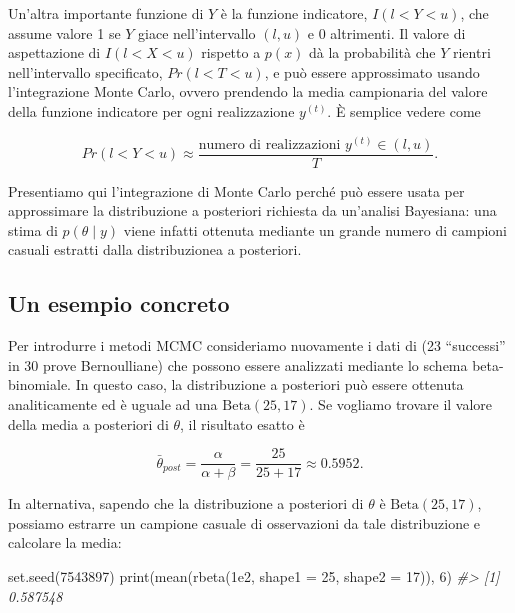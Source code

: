 \documentclass[
  11pt,
]{krantz}
\makeatletter
\newenvironment{Shaded}{\begin{snugshade}}{\end{snugshade}}
\newcommand{\AttributeTok}[1]{\textcolor[rgb]{0.61,0.61,0.61}{#1}}
\newcommand{\CommentTok}[1]{\textcolor[rgb]{0.37,0.37,0.37}{\textit{#1}}}
\newcommand{\DecValTok}[1]{\textcolor[rgb]{0.06,0.06,0.06}{#1}}
\newcommand{\FloatTok}[1]{\textcolor[rgb]{0.06,0.06,0.06}{#1}}
\newcommand{\FunctionTok}[1]{\textcolor[rgb]{0,0,0}{#1}}
\newcommand{\NormalTok}[1]{#1}
\newenvironment{kframe}{%
\medskip{}
\setlength{\fboxsep}{.8em}
 \def\at@end@of@kframe{}%
 \ifinner\ifhmode%
  \def\at@end@of@kframe{\end{minipage}}%
  \begin{minipage}{\columnwidth}%
 \fi\fi%
 \def\FrameCommand##1{\hskip\@totalleftmargin \hskip-\fboxsep
 \colorbox{shadecolor}{##1}\hskip-\fboxsep
     \hskip-\linewidth \hskip-\@totalleftmargin \hskip\columnwidth}%
 \MakeFramed {\advance\hsize-\width
   \@totalleftmargin\z@ \linewidth\hsize
   \@setminipage}}%
 {\par\unskip\endMakeFramed%
 \at@end@of@kframe}
\renewenvironment{Shaded}{\begin{kframe}}{\end{kframe}}
\theoremstyle{definition}
\theoremstyle{definition}
\theoremstyle{definition}
\theoremstyle{definition}
\theoremstyle{remark}
\makeatother
\begin{document}
Un'altra importante funzione di \(Y\) è la funzione indicatore, \(I(l < Y < u)\), che assume valore 1 se \(Y\) giace nell'intervallo \((l,u)\) e 0 altrimenti. Il valore di aspettazione di \(I(l < X < u)\) rispetto a \(p(x)\) dà la probabilità che \(Y\) rientri nell'intervallo specificato, \(Pr(l < T < u)\), e può essere approssimato usando l'integrazione Monte Carlo, ovvero prendendo la media campionaria del valore della funzione indicatore per ogni realizzazione \(y^{(t)}\). È semplice vedere come

\[
Pr(l < Y < u) \approx \frac{\text{numero di realizzazioni } y^{(t)} \in (l, u)}{T}.
\]

Presentiamo qui l'integrazione di Monte Carlo perché può essere usata per approssimare la distribuzione a posteriori richiesta da un'analisi Bayesiana: una stima di \(p(\theta \mid y)\) viene infatti ottenuta mediante un grande numero di campioni casuali estratti dalla distribuzionea a posteriori.

\hypertarget{un-esempio-concreto-3}{%
\subsection{Un esempio concreto}\label{un-esempio-concreto-3}}

Per introdurre i metodi MCMC consideriamo nuovamente i dati di \citet{zetschefuture2019} (23 ``successi'' in 30 prove Bernoulliane) che possono essere analizzati mediante lo schema beta-binomiale. In questo caso, la distribuzione a posteriori può essere ottenuta analiticamente ed è uguale ad una \(\mbox{Beta}(25, 17)\). Se vogliamo trovare il valore della media a posteriori di \(\theta\), il risultato esatto è

\[
\bar{\theta}_{post} = \frac{\alpha}{\alpha + \beta} = \frac{25}{25 + 17} \approx 0.5952.
\]

In alternativa, sapendo che la distribuzione a posteriori di \(\theta\) è \(\mbox{Beta}(25, 17)\), possiamo estrarre un campione casuale di osservazioni da tale distribuzione e calcolare la media:

\begin{Shaded}
\begin{Highlighting}[]
\FunctionTok{set.seed}\NormalTok{(}\DecValTok{7543897}\NormalTok{)}
\FunctionTok{print}\NormalTok{(}\FunctionTok{mean}\NormalTok{(}\FunctionTok{rbeta}\NormalTok{(}\FloatTok{1e2}\NormalTok{, }\AttributeTok{shape1 =} \DecValTok{25}\NormalTok{, }\AttributeTok{shape2 =} \DecValTok{17}\NormalTok{)), }\DecValTok{6}\NormalTok{)}
\CommentTok{\#\textgreater{} [1] 0.587548}
\end{Highlighting}
\end{Shaded}
\end{document}
